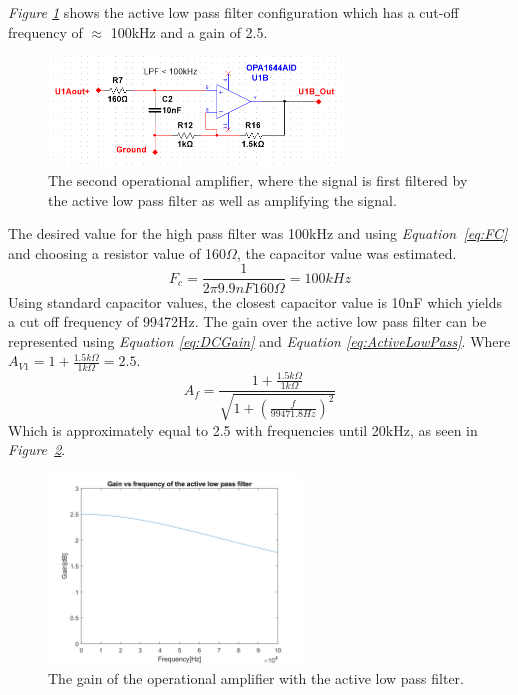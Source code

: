 \vspace{4cm}

\textit{Figure \ref{fig:Opamp2}} shows the active low pass filter configuration which has a cut-off frequency of $\approx$ 100kHz and a gain of 2.5.

\begin{figure}[h]
    \centering
    \includegraphics[width=0.7\textwidth]{graphics/OPamp2.png}
    \caption{The second operational amplifier, where the signal is first filtered by the active low pass filter as well as amplifying the signal.}
    \label{fig:Opamp2}
\end{figure}

The desired value for the high pass filter was 100kHz and using \textit{Equation~\ref{eq:FC}} and choosing a resistor value of 160$\Omega$, the capacitor value was estimated.   
$$F_c = \frac{1}{2\pi 9.9nF 160\Omega} = 100kHz$$
Using standard capacitor values, the closest capacitor value is 10nF which yields a cut off frequency of 99472Hz.
The gain over the active low pass filter can be represented using \textit{Equation \ref{eq:DCGain}} and \textit{Equation \ref{eq:ActiveLowPass}}. 
Where $A_{V1} = 1 + \frac{1.5k\Omega}{1k\Omega} = 2.5$.
$$A_f  = \frac{1 + \frac{1.5k\Omega}{1k\Omega}}{\sqrt{1 + (\frac{f}{99471.8Hz})^2}}$$
Which is approximately equal to 2.5 with frequencies until 20kHz, as seen in 
\textit{Figure~\ref{fig:AVlowpass}}.

\begin{figure}[h]
    \centering
    \includegraphics[width=0.6\textwidth]{graphics/Av_Lowpass.png}
    \caption{The gain of the operational amplifier with the active low pass filter.}
    \label{fig:AVlowpass}
\end{figure}

